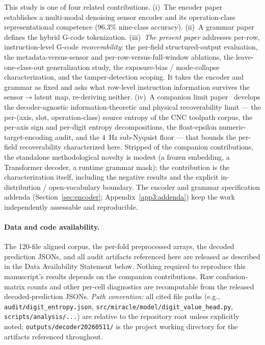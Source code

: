 \documentclass[sensors,article,submit,moreauthors,pdftex]{Definitions/mdpi}
\begin{document}
This study is one of four related contributions. (i)~The encoder paper~\cite{encoder_paper} establishes a multi-modal denoising sensor encoder and its operation-class representational competence ($96.3\%$ nine-class accuracy). (ii)~A grammar paper~\cite{grammar_paper} defines the hybrid G-code tokenization. (iii)~\emph{The present paper} addresses per-row, instruction-level G-code \emph{recoverability}: the per-field structured-output evaluation, the metadata-versus-sensor and per-row-versus-full-window ablations, the leave-one-class-out generalization study, the exposure-bias / mode-collapse characterization, and the tamper-detection scoping. It takes the encoder and grammar as fixed and asks what row-level instruction information survives the sensor$\rightarrow$latent map, re-deriving neither. (iv)~A companion limit paper~\cite{paperB_entropy} develops the decoder-agnostic information-theoretic and physical recoverability limit --- the per-(axis, slot, operation-class) source entropy of the CNC toolpath corpus, the per-axis sign and per-digit entropy decompositions, the float-epsilon numeric-target-encoding audit, and the 4~Hz sub-Nyquist floor --- that bounds the per-field recoverability characterized here. Stripped of the companion contributions, the standalone methodological novelty is modest (a frozen embedding, a Transformer decoder, a runtime grammar mask); the contribution is the characterization itself, including the negative results and the explicit in-distribution / open-vocabulary boundary. The encoder and grammar specification addenda (Section~\ref{sec:encoder}; Appendix~\ref{app3:addenda}) keep the work independently assessable and reproducible.

\paragraph{Data and code availability.} The 120-file aligned corpus, the per-fold preprocessed arrays, the decoded prediction JSONs, and all audit artifacts referenced here are released as described in the Data Availability Statement below. Nothing required to reproduce this manuscript's results depends on the companion contributions. Raw confusion-matrix counts and other per-cell diagnostics are recomputable from the released decoded-prediction JSONs. \emph{Path convention:} all cited file paths (e.g., \texttt{audit/digit\_entropy.json}, \texttt{src/miracle/model/digit\_value\_head.py}, \texttt{scripts/analysis/...}) are relative to the repository root unless explicitly noted; \texttt{outputs/decoder20260511/} is the project working directory for the artifacts referenced throughout.
\end{document}
